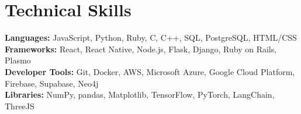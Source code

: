 \documentclass[letterpaper,11pt]{article}
\begin{document}
\section{Technical Skills}
 \begin{itemize}[leftmargin=0.15in, label={}]
    \small{\item{
     \textbf{Languages: }{JavaScript, Python, Ruby, C, C++, SQL, PostgreSQL, HTML/CSS} \\
     \textbf{Frameworks: }{React, React Native, Node.js, Flask, Django, Ruby on Rails, Plasmo} \\
     \textbf{Developer Tools: }{Git, Docker, AWS, Microsoft Azure, Google Cloud Platform, Firebase, Supabase, Neo4j} \\
     \textbf{Libraries: }{NumPy, pandas, Matplotlib, TensorFlow, PyTorch, LangChain, ThreeJS}
    }}
 \end{itemize}


\end{document}
